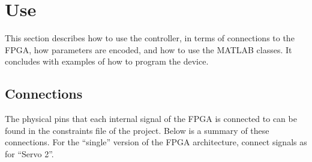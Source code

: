 \documentclass{article}
\begin{document}
\section{Use}
\label{sec:Use}
This section describes how to use the controller, in terms of connections to the FPGA, how parameters are encoded, and how to use the MATLAB classes.  It concludes with examples of how to program the device.

\subsection{Connections}
\label{ssec:connections}
The physical pins that each internal signal of the FPGA is connected to can be found in the constraints file of the project.  Below is a summary of these connections.  For the ``single'' version of the FPGA architecture, connect signals as for ``Servo 2''.
\end{document}
